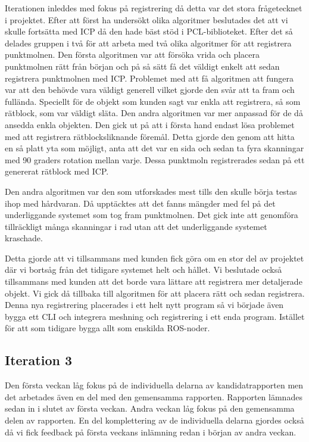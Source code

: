 Iterationen inleddes med fokus på registrering då detta var det stora frågetecknet i projektet. Efter att först ha undersökt olika algoritmer beslutades det att vi skulle fortsätta med ICP då den hade bäst stöd i PCL-biblioteket. Efter det så delades gruppen i två för att arbeta med två olika algoritmer för att registrera punktmolnen. Den första algoritmen var att försöka vrida och placera punktmolnen rätt från början och på så sätt få det väldigt enkelt att sedan registrera punktmolnen med ICP. Problemet med att få algoritmen att fungera var att den behövde vara väldigt generell vilket gjorde den svår att ta fram och fullända. Speciellt för de objekt som kunden sagt var enkla att registrera, så som rätblock, som var väldigt släta. Den andra algoritmen var mer anpassad för de då ansedda enkla objekten. Den gick ut på att i första hand endast lösa problemet med att registrera rätblocksliknande föremål. Detta gjorde den genom att hitta en så platt yta som möjligt, anta att det var en sida och sedan ta fyra skanningar med 90 graders rotation mellan varje. Dessa punktmoln registrerades sedan på ett genererat rätblock med ICP.

Den andra algoritmen var den som utforskades mest tills den skulle börja testas ihop med hårdvaran. Då upptäcktes att det fanns mängder med fel på det underliggande systemet som tog fram punktmolnen. Det gick inte att genomföra tillräckligt många skanningar i rad utan att det underliggande systemet kraschade. 

Detta gjorde att vi tillsammans med kunden fick göra om en stor del av projektet där vi bortsåg från det tidigare systemet helt och hållet. Vi beslutade också tillsammans med kunden att det borde vara lättare att registrera mer detaljerade objekt. Vi gick då tillbaka till algoritmen för att placera rätt och sedan registrera. Denna nya registrering placerades i ett helt nytt program så vi började även bygga ett CLI och integrera meshning och registrering i ett enda program. Istället för att som tidigare bygga allt som enskilda ROS-noder.

\subsection{Iteration 3}

Den första veckan låg fokus på de individuella delarna av kandidatrapporten men det arbetades även en del med den gemensamma rapporten. Rapporten lämnades sedan in i slutet av första veckan. Andra veckan låg fokus på den gemensamma delen av rapporten. En del komplettering av de individuella delarna gjordes också då vi fick feedback på första veckans inlämning redan i början av andra veckan.


